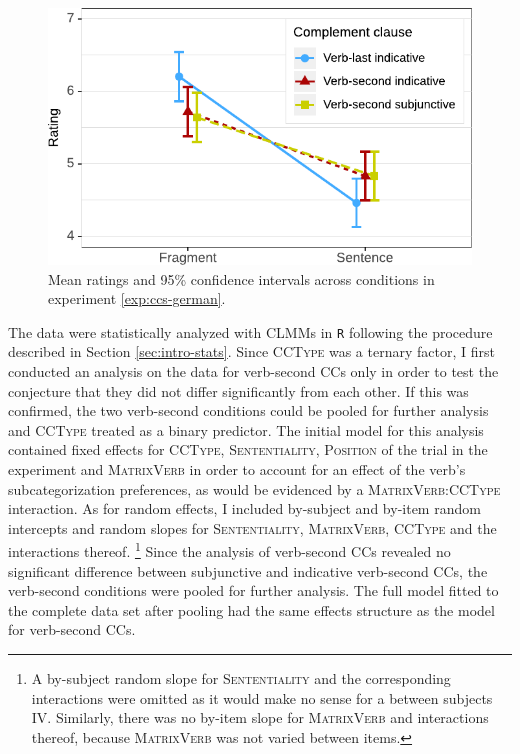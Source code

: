 \begin{figure}
\includegraphics[scale=1]{figures/ex2b_ccs_de_lc_estimates}
 \caption{Mean ratings and 95\% confidence intervals across conditions in experiment \ref{exp:ccs-german}. \label{fig:ccs-german-estimates}}
\end{figure}
%
The data were statistically analyzed with CLMMs in \texttt{R} following the procedure described in Section \ref{sec:intro-stats}. Since \textsc{CCType} was a ternary factor, I first conducted an analysis on the data for verb-second CCs only in order to test the conjecture that they did not differ significantly from each other. If this was confirmed, the two verb-second conditions could be pooled for further analysis and \textsc{CCType} treated as a binary predictor. The initial model for this analysis contained fixed effects for \textsc{CCType}, \textsc{Sententiality}, \textsc{Position} of the trial in the experiment and \textsc{MatrixVerb} in order to account for an effect of the verb's subcategorization preferences, as would be evidenced by a \textsc{MatrixVerb:CCType} interaction. As for random effects, I included by-subject and by-item random intercepts and random slopes for \textsc{Sententiality}, \textsc{MatrixVerb}, \textsc{CCType} and the interactions thereof.%
% 
\footnote{A by-subject random slope for \textsc{Sententiality} and the corresponding interactions were omitted as it would make no sense for a between subjects IV. Similarly, there was no by-item slope for \textsc{MatrixVerb} and interactions thereof, because \textsc{MatrixVerb} was not varied between items.}\afterfn%
%
Since the analysis of verb-second CCs revealed no significant difference between subjunctive and indicative  verb-second CCs, the verb-second conditions were pooled for further analysis. The full model fitted to the complete data set after pooling had the same effects structure as the model for verb-second CCs.\largerpage

